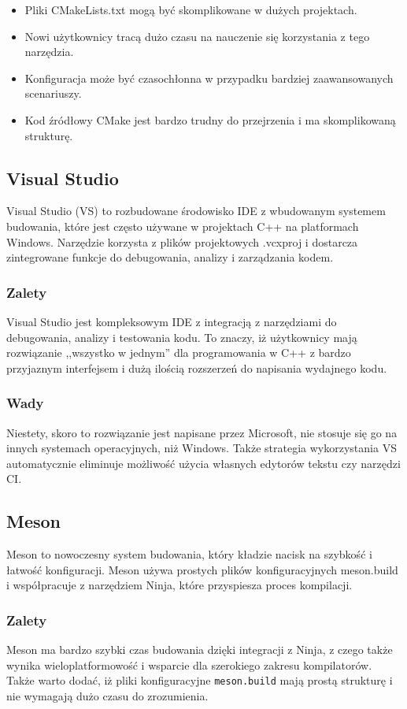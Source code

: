 \begin{itemize}
    \item Pliki CMakeLists.txt mogą być skomplikowane w dużych projektach.
    \item Nowi użytkownicy tracą dużo czasu na nauczenie się korzystania z tego narzędzia.
    \item Konfiguracja może być czasochłonna w przypadku bardziej zaawansowanych scenariuszy.
    \item Kod źródłowy CMake jest bardzo trudny do przejrzenia i ma skomplikowaną strukturę.
\end{itemize}

\subsection{Visual Studio}
Visual Studio (VS) to rozbudowane środowisko IDE z wbudowanym systemem budowania, które jest często używane w projektach C++ na platformach Windows. Narzędzie korzysta z plików projektowych .vcxproj i dostarcza zintegrowane funkcje do debugowania, analizy i zarządzania kodem.

\subsubsection{Zalety}
Visual Studio jest kompleksowym IDE z integracją z narzędziami do debugowania, analizy i testowania kodu. To znaczy, iż użytkownicy mają rozwiązanie ,,wszystko w jednym'' dla programowania w C++ z bardzo przyjaznym interfejsem i dużą ilością rozszerzeń do napisania wydajnego kodu.

\subsubsection{Wady}
Niestety, skoro to rozwiązanie jest napisane przez Microsoft, nie stosuje się go na innych systemach operacyjnych, niż Windows. Także strategia wykorzystania VS automatycznie eliminuje możliwość użycia własnych edytorów tekstu czy narzędzi CI.

\subsection{Meson}
Meson to nowoczesny system budowania, który kładzie nacisk na szybkość i łatwość konfiguracji. Meson używa prostych plików konfiguracyjnych meson.build i współpracuje z narzędziem Ninja, które przyspiesza proces kompilacji.

\subsubsection{Zalety}
Meson ma bardzo szybki czas budowania dzięki integracji z Ninja, z czego także wynika wieloplatformowość i wsparcie dla szerokiego zakresu kompilatorów. Także warto dodać, iż  pliki konfiguracyjne \texttt{meson.build} mają prostą strukturę i nie wymagają dużo czasu do zrozumienia.

